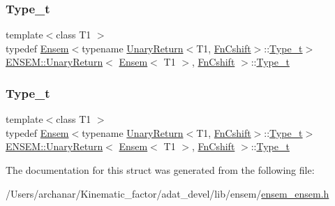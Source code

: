 \subsubsection{\texorpdfstring{Type\_t}{Type\_t}\hspace{0.1cm}{\footnotesize\ttfamily [1/2]}}
{\footnotesize\ttfamily template$<$class T1 $>$ \\
typedef \mbox{\hyperlink{classENSEM_1_1Ensem}{Ensem}}$<$typename \mbox{\hyperlink{structENSEM_1_1UnaryReturn}{Unary\+Return}}$<$T1, \mbox{\hyperlink{structENSEM_1_1FnCshift}{Fn\+Cshift}}$>$\+::\mbox{\hyperlink{structENSEM_1_1UnaryReturn_3_01Ensem_3_01T1_01_4_00_01FnCshift_01_4_a1adec9b456e13e2aebde180312ff6235}{Type\+\_\+t}}$>$ \mbox{\hyperlink{structENSEM_1_1UnaryReturn}{E\+N\+S\+E\+M\+::\+Unary\+Return}}$<$ \mbox{\hyperlink{classENSEM_1_1Ensem}{Ensem}}$<$ T1 $>$, \mbox{\hyperlink{structENSEM_1_1FnCshift}{Fn\+Cshift}} $>$\+::\mbox{\hyperlink{structENSEM_1_1UnaryReturn_3_01Ensem_3_01T1_01_4_00_01FnCshift_01_4_a1adec9b456e13e2aebde180312ff6235}{Type\+\_\+t}}}

\mbox{\label{structENSEM_1_1UnaryReturn_3_01Ensem_3_01T1_01_4_00_01FnCshift_01_4_a1adec9b456e13e2aebde180312ff6235}} 
\subsubsection{\texorpdfstring{Type\_t}{Type\_t}\hspace{0.1cm}{\footnotesize\ttfamily [2/2]}}
{\footnotesize\ttfamily template$<$class T1 $>$ \\
typedef \mbox{\hyperlink{classENSEM_1_1Ensem}{Ensem}}$<$typename \mbox{\hyperlink{structENSEM_1_1UnaryReturn}{Unary\+Return}}$<$T1, \mbox{\hyperlink{structENSEM_1_1FnCshift}{Fn\+Cshift}}$>$\+::\mbox{\hyperlink{structENSEM_1_1UnaryReturn_3_01Ensem_3_01T1_01_4_00_01FnCshift_01_4_a1adec9b456e13e2aebde180312ff6235}{Type\+\_\+t}}$>$ \mbox{\hyperlink{structENSEM_1_1UnaryReturn}{E\+N\+S\+E\+M\+::\+Unary\+Return}}$<$ \mbox{\hyperlink{classENSEM_1_1Ensem}{Ensem}}$<$ T1 $>$, \mbox{\hyperlink{structENSEM_1_1FnCshift}{Fn\+Cshift}} $>$\+::\mbox{\hyperlink{structENSEM_1_1UnaryReturn_3_01Ensem_3_01T1_01_4_00_01FnCshift_01_4_a1adec9b456e13e2aebde180312ff6235}{Type\+\_\+t}}}



The documentation for this struct was generated from the following file\+:\begin{DoxyCompactItemize}
\item 
/\+Users/archanar/\+Kinematic\+\_\+factor/adat\+\_\+devel/lib/ensem/\mbox{\hyperlink{lib_2ensem_2ensem__ensem_8h}{ensem\+\_\+ensem.\+h}}\end{DoxyCompactItemize}
